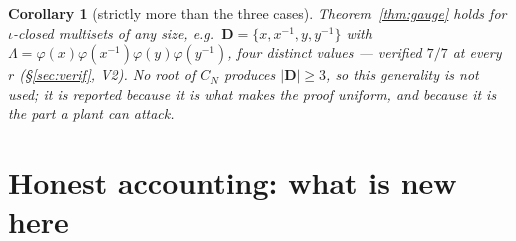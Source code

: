 \documentclass[11pt]{article}
\newtheorem{cor}[thm]{Corollary}
\theoremstyle{definition}
\newcommand{\bD}{\mathbf{D}}
\begin{document}
\begin{cor}[strictly more than the three cases]\label{cor:more}
Theorem~\ref{thm:gauge} holds for $\iota$-closed multisets of any size, e.g.\
$\bD=\{x,x^{-1},y,y^{-1}\}$ with
$\Lambda=\varphi(x)\varphi(x^{-1})\varphi(y)\varphi(y^{-1})$, four distinct
values --- verified $7/7$ at every $r$ (\S\ref{sec:verif}, V2).  No root of $C_N$ produces $|\bD|\ge3$, so this
generality is not used; it is reported because it is what makes the proof
uniform, and because it is the part a plant can attack.
\end{cor}

\section{Honest accounting: what is new here}
\label{sec:priority}
\end{document}
